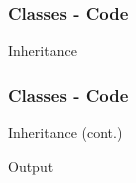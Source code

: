 \begin{frame}\frametitle{Classes - Code}
Inheritance


\end{frame}

\begin{frame}[fragile]\frametitle{Classes - Code}
Inheritance (cont.)
\begin{center}

\end{center}

Output

\end{frame}
